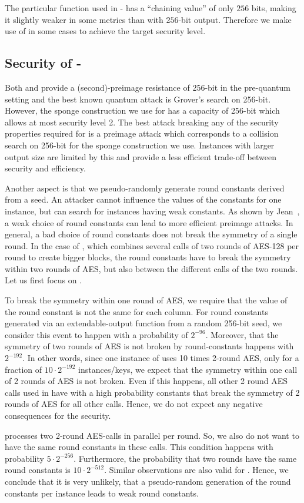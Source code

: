 The particular function \shatwofs used in \spx-\shatwo
has a ``chaining value'' of only $256$ bits,
making it slightly weaker in some metrics
than \shaketfs with $256$-bit output.
Therefore we make use of \shatwofivetwelve in some cases to achieve the target security level.


\subsection{Security of \spx-\haraka}
Both  and  provide a (second)-preimage 
resistance of 256-bit in the pre-quantum setting and the best known quantum attack 
is Grover's search on 256-bit. However, the sponge construction we use for 
\harakasponge has a capacity of 256-bit which allows at most security level 2. 
The best attack breaking any of the security properties required for \spx is a 
preimage attack which corresponds to a collision search on 256-bit for the 
sponge construction we use. 
Instances with larger output size are limited by this
and provide a less efficient trade-off between security and efficiency.

Another aspect is that we pseudo-randomly generate round constants derived 
from a seed. An attacker cannot influence the values of the constants
for one instance, but can search for instances having weak constants. As shown by 
Jean~\cite{toscJean16}, a weak choice of round constants can lead to more efficient
preimage attacks. In general, a bad choice of round constants does not break the 
symmetry of a single round. In the case of \haraka, which combines several 
calls of two rounds of AES-128 per round to create bigger blocks, the round 
constants have to break the symmetry within two rounds of AES, but also 
between the different calls of the two rounds. Let us first focus on 
.

To break the symmetry within one round of AES, we require that the value of the 
round constant is not the same for each column. For round constants generated 
via an extendable-output function from a random 256-bit seed, we consider 
this event to happen with a probability of $2^{-96}$. Moreover, that the 
symmetry of two rounds of AES is not broken by round-constants happens with 
$2^{-192}$. In other words, since one instance of  uses 10 times 
2-round AES, only for a fraction of $10\cdot2^{-192}$ instances/keys,
we expect that the symmetry within one call of 2 rounds of AES is not broken. 
Even if this happens, all other 2 round AES calls used in 
have with a high probability constants that break the symmetry of 2 rounds of 
AES for all other calls. Hence, we do not expect any negative consequences for 
the security.

 processes two 2-round AES-calls in parallel per round. So, 
we also do not want to have the same round constants in these calls. 
This condition happens with probability $5\cdot2^{-256}$. Furthermore, 
the probability that two rounds have the same round constants 
is $10\cdot2^{-512}$. Similar observations are also valid for .
Hence, we conclude that it is very unlikely, that a pseudo-random generation of 
the round constants per instance leads to weak round constants.
